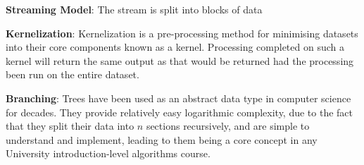 \textbf{Streaming Model}: The stream is split into blocks of data

\textbf{Kernelization}: Kernelization is a pre-processing method for
minimising datasets into their core components known as a kernel.
Processing completed on such a kernel will return the same output as
that would be returned had the processing been run on the entire
dataset.

\textbf{Branching}: Trees have been used as an abstract data type in
computer science for decades. They provide relatively easy logarithmic
complexity, due to the fact that they split their data into \(n\)
sections recursively, and are simple to understand and implement,
leading to them being a core concept in any University
introduction-level algorithms course.